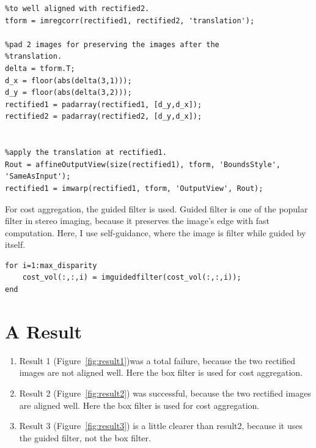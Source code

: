 \begin{lstlisting}[style=Matlab-editor]
%calculate the affine2d for translate rectified1 
%to well aligned with rectified2.
tform = imregcorr(rectified1, rectified2, 'translation');

%pad 2 images for preserving the images after the
%translation.
delta = tform.T;
d_x = floor(abs(delta(3,1)));
d_y = floor(abs(delta(3,2)));
rectified1 = padarray(rectified1, [d_y,d_x]);
rectified2 = padarray(rectified2, [d_y,d_x]);


%apply the translation at rectified1.
Rout = affineOutputView(size(rectified1), tform, 'BoundsStyle', 'SameAsInput');
rectified1 = imwarp(rectified1, tform, 'OutputView', Rout);
\end{lstlisting}


For cost aggregation, the guided filter is used. Guided filter is one of the popular filter in stereo imaging, because it preserves the image's edge with fast computation\cite{6012131}. Here, I use self-guidance, where the image is filter while guided by itself.

\begin{lstlisting}[style=Matlab-editor]
for i=1:max_disparity
    cost_vol(:,:,i) = imguidedfilter(cost_vol(:,:,i)); 
end
\end{lstlisting}

\section*{A Result}

\begin{enumerate}
    \item Result 1 (Figure~\ref{fig:result1})was a total failure, because the two rectified images are not aligned well. Here the box filter is used for cost aggregation.
    \item Result 2 (Figure~\ref{fig:result2}) was successful, because the two rectified images are aligned well. Here the box filter is used for cost aggregation.
    \item Result 3 (Figure~\ref{fig:result3}) is a little clearer than result2, because it uses the guided filter, not the box filter.
\end{enumerate}

